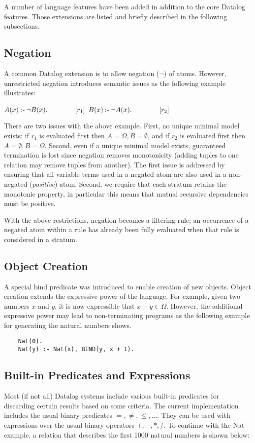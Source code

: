 A number of language features have been added in addition to the core Datalog features. Those extensions are listed and briefly described in the following subsections.
\vspace*{-5 pt}
\subsection{Negation}
A common Datalog extension is to allow negation ($\neg$) of atoms. However, unrestricted negation introduces semantic issues as the following example illustrates:

\NL
{\centering
	$A(x) \mathbin{:\hspace{-0.5ex}\textsf{-}} \neg B(x).\qquad\qquad[r_1]$ \NL
	$B(x) \mathbin{:\hspace{-0.5ex}\textsf{-}} \neg A(x).\qquad\qquad[r_2]$\par
}
\vspace*{-10pt}
\NL
There are two issues with the above example. First, no unique minimal model exists: if $r_1$ is evaluated first then $A = \Omega, B = \emptyset$, and if $r_2$ is evaluated first then $A = \emptyset, B = \Omega$. Second, even if a unique minimal model exists, guaranteed termination is lost since negation removes monotonicity (adding tuples to one relation may remove tuples from another). The first issue is addressed by ensuring that all variable terms used in a negated atom are also used in a non-negated (\textit{positive}) atom. Second, we require that each stratum retains the monotonic property, in particular this means that mutual recursive dependencies must be positive.

With the above restrictions, negation becomes a filtering rule; an occurrence of a negated atom within a rule has already been fully evaluated when that rule is considered in a stratum.
\vspace*{-5pt}
\subsection{Object Creation}
A special bind predicate was introduced to enable creation of new objects. Object creation extends the expressive power of the language. For example, given two numbers $x$ and $y$, it is now expressible that $x + y \in \Omega$. However, the additional expressive power may lead to non-terminating programs as the following example for generating the natural numbers shows. 

\begin{verbatim}
	Nat(0).
	Nat(y) :- Nat(x), BIND(y, x + 1).
\end{verbatim}
\noindent
\subsection{Built-in Predicates and Expressions}
Most (if not all) Datalog systems include various built-in predicates for discarding certain results based on some criteria. The current implementation includes the usual binary predicates $=, \neq, \leq, \ldots$. They can be used with expressions over the usual binary operators $+,-,*,/$. To continue with the Nat example, a relation that describes the first 1000 natural numbers is shown below:

